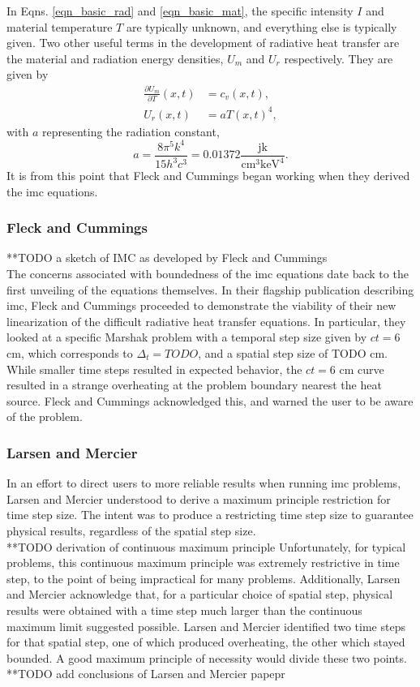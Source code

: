In Eqns. \ref{eqn_basic_rad} and \ref{eqn_basic_mat}, the specific intensity $I$ and material temperature $T$ are typically unknown, and everything else is typically given.  Two other useful terms in the development of radiative heat transfer are the material and radiation energy densities, $U_m$ and $U_r$ respectively.  They are given by
\begin{align}\label{eqn_E_density_basic}
\frac{\partial U_m}{\partial T}(x,t)&=c_v(x,t),\\
U_r(x,t)&=aT(x,t)^4,
\end{align}
with $a$ representing the radiation constant,
\begin{equation}
a=\frac{8\pi^5k^4}{15h^3c^3}=0.01372\frac{\mbox{jk}}{\mbox{cm}^3\mbox{keV}^4}.
\end{equation}
It is from this point that Fleck and Cummings began working when they derived the \gls{imc} equations.

\subsubsection{Fleck and Cummings}
 **TODO a sketch of IMC as developed by Fleck and Cummings\\ %
The concerns associated with boundedness of the \gls{imc} equations date back to the first unveiling of the equations themselves.  In their flagship publication describing \gls{imc}, Fleck and Cummings proceeded to demonstrate the viability of their new linearization of the difficult radiative heat transfer equations.  In particular, they looked at a specific Marshak problem with a temporal step size given by $ct=6$ cm, which corresponds to $\Delta_t=TODO$, and a spatial step size of TODO cm.  While smaller time steps resulted in expected behavior, the $ct=6$ cm curve resulted in a strange overheating at the problem boundary nearest the heat source.  Fleck and Cummings acknowledged this, and warned the user to be aware of the problem.


\subsubsection{Larsen and Mercier}
In an effort to direct users to more reliable results when running \gls{imc} problems, Larsen and Mercier understood to derive a maximum principle restriction for time step size.  The intent was to produce a restricting time step size to guarantee physical results, regardless of the spatial step size.
\\ **TODO derivation of continuous maximum principle
Unfortunately, for typical problems, this continuous maximum principle was extremely restrictive in time step, to the point of being impractical for many problems.  Additionally, Larsen and Mercier acknowledge that, for a particular choice of spatial step, physical results were obtained with a time step much larger than the continuous maximum limit suggested possible.  Larsen and Mercier identified two time steps for that spatial step, one of which produced overheating, the other which stayed bounded.  A good maximum principle of necessity would divide these two points.
\\ **TODO add conclusions of Larsen and Mercier papepr


